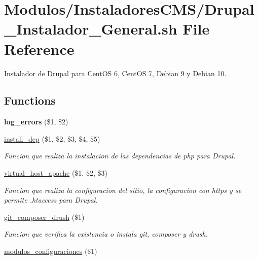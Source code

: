 \hypertarget{Drupal__Instalador__General_8sh}{}\section{Modulos/\+Instaladores\+C\+M\+S/\+Drupal\+\_\+\+Instalador\+\_\+\+General.sh File Reference}
\label{Drupal__Instalador__General_8sh}


Instalador de Drupal para Cent\+OS 6, Cent\+OS 7, Debian 9 y Debian 10.  


\subsection*{Functions}
\begin{DoxyCompactItemize}
\item 
\mbox{\label{Drupal__Instalador__General_8sh_a92067b58a8478c9841b2cd9b75ea3565}} 
{\bfseries log\+\_\+errors} (\$1, \$2)
\item 
\hyperlink{Drupal__Instalador__General_8sh_a867cb91b69b68d903ea8d2ebcff6ea36}{install\+\_\+dep} (\$1, \$2, \$3, \$4, \$5)
\begin{DoxyCompactList}\small\item\em Funcion que realiza la instalacion de las dependencias de php para Drupal. \end{DoxyCompactList}\item 
\hyperlink{Drupal__Instalador__General_8sh_a2ea632f8e04de9564521b12cf10c47f4}{virtual\+\_\+host\+\_\+apache} (\$1, \$2, \$3)
\begin{DoxyCompactList}\small\item\em Funcion que realiza la configuracion del sitio, la configuracion con https y se permite .htaccess para Drupal. \end{DoxyCompactList}\item 
\hyperlink{Drupal__Instalador__General_8sh_a3cc44682ce03ae17ac41a78185920c59}{git\+\_\+composer\+\_\+drush} (\$1)
\begin{DoxyCompactList}\small\item\em Funcion que verifica la existencia o instala git, composer y drush. \end{DoxyCompactList}\item 
\hyperlink{Drupal__Instalador__General_8sh_ae5ce76ad68690ff00cb63811e18c8a37}{modulos\+\_\+configuraciones} (\$1)

\end{DoxyCompactItemize}
